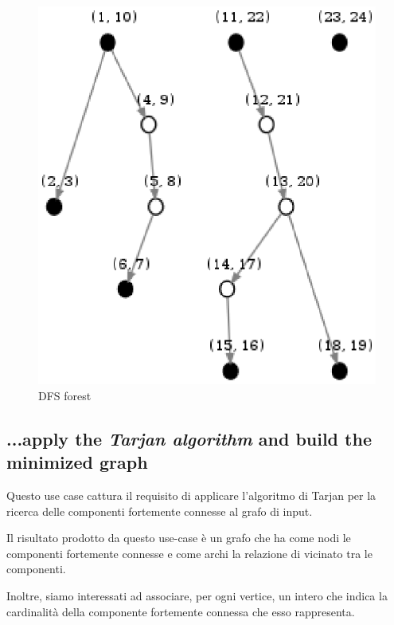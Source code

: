 \begin{figure}
  \centering
  \includegraphics{images/OnePipingLevelUnitTest_Printer_DFS_PrinterPipe_Papadimitriou-phase-PrinterPipeFilter-level-2.eps}
  \caption{DFS forest}
  \label{fig:dfs-forest}
\end{figure}

\subsection{...apply the \emph{Tarjan algorithm} and build the
  minimized graph}
\label{subsection:use-case-tarjan}
Questo use case cattura il requisito di applicare l'algoritmo di
Tarjan per la ricerca delle componenti fortemente connesse al grafo di
input.

Il risultato prodotto da questo use-case \`e un grafo che ha
come nodi le componenti fortemente connesse e come archi la relazione
di vicinato tra le componenti.

Inoltre, siamo interessati ad associare, per ogni vertice, un intero
che indica la cardinalit\`a della componente fortemente connessa che
esso rappresenta.

